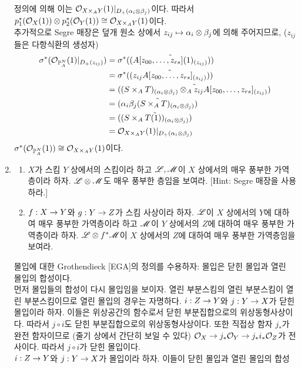 \begin{enumerate}[label=\tb{5.\arabic*.},itemindent=0mm,itemsep=4mm]
\begin{align*}
	\end{align*}
	정의에 의해 이는 $\mathcal{O}_{X\times_AY}(1)|_{D_+(\alpha_i\otimes\beta_j)}$이다.
	따라서 $p_1^*(\mathcal{O}_X(1))\otimes p_2^*(\mathcal{O}_Y(1))\cong\mathcal{O}_{X\times_AY}(1)$이다.\\
	추가적으로 Segre 매장은 덮개 원소 상에서 $z_{ij}\mapsto\alpha_i\otimes\beta_j$에 의해 주어지므로,
	($z_{ij}$들은 다항식환의 생성자)
	\begin{align*}
	\sigma^*(\mathcal{O}_{\mathbb{P}_A^N}(1)|_{D_+(z_{ij})})&=\sigma^*(\tilde{(A[z_{00},\ldots,z_{rs}](1)_{(z_{ij})})})\\
	&=\sigma^*(\tilde{(z_{ij}A[z_{00},\ldots,z_{rs}]_{(z_{ij})})})\\
	&=\tilde{((S\times_AT)_{(\alpha_i\otimes\beta_j)}\otimes_Az_{ij}A[z_{00},\ldots,z_{rs}]_{(z_{ij})})}\\
	&=\tilde{(\alpha_i\beta_j(S\times_AT)_{(\alpha_i\otimes\beta_j)})}\\
	&=\tilde{((S\times_AT(1))_{(\alpha_i\otimes\beta_j)})}\\
	&=\mathcal{O}_{X\times_AY}(1)|_{D_+(\alpha_i\otimes\beta_j)}
	\end{align*}
	$\sigma^*(\mathcal{O}_{\mathbb{P}_A^N}(1))\cong\mathcal{O}_{X\times_AY}(1)$이다.
	\item \begin{enumerate}[label=(\alph*)]
	\item $X$가 스킴 $Y$ 상에서의 스킴이라 하고 $\mathscr{L},\mathscr{M}$이 $X$ 상에서의 매우 풍부한 가역층이라 하자.
	$\mathscr{L}\otimes\mathscr{M}$도 매우 풍부한 층임을 보여라. [Hint: Segre 매장을 사용하라.]
	\item $f:X\rightarrow Y$와 $g:Y\rightarrow Z$가 스킴 사상이라 하자. $\mathscr{L}$이 $X$ 상에서의 $Y$에 대하여 매우 풍부한 가역층이라 하고
	$\mathscr{M}$이 $Y$ 상에서의 $Z$에 대하여 매우 풍부한 가역층이라 하자.
	$\mathscr{L}\otimes f^*\mathscr{M}$이 $X$ 상에서의 $Z$에 대하여 매우 풍부한 가역층임을 보여라.
	\end{enumerate}
	\sol 몰입에 대한 Grothendieck [EGA]의 정의를 수용하자: 몰입은 닫힌 몰입과 열린 몰입의 합성이다.\\
	먼저 몰입들의 합성이 다시 몰입임을 보이자.
	열린 부분스킴의 열린 부분스킴이 열린 부분스킴이므로 열린 몰입의 경우는 자명하다.
	$i:Z\rightarrow Y$와 $j:Y\rightarrow X$가 닫힌 몰입이라 하자. 이들은 위상공간의 함수로서 닫힌 부분집합으로의 위상동형사상이다.
	따라서 $j\circ i$도 닫힌 부분집합으로의 위상동형사상이다.
	또한 직접상 함자 $j_*$가 완전 함자이므로 (줄기 상에서 간단히 보일 수 있다) $\mathcal{O}_X\rightarrow j_*\mathcal{O}_Y\rightarrow j_*i_*\mathcal{O}_Z$가 전사이다.
	따라서 $j\circ i$가 닫힌 몰입이다.\\
	$i:Z\rightarrow Y$와 $j:Y\rightarrow X$가 몰입이라 하자. 이들이 닫힌 몰입과 열린 몰입의 합성

\end{enumerate}
